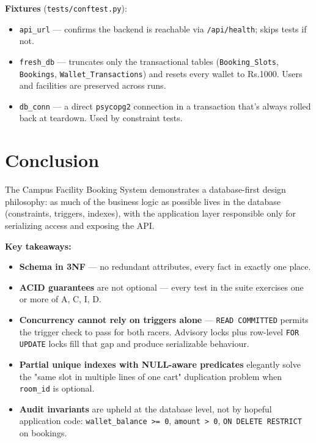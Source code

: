 \documentclass[11pt,a4paper]{article}
\begin{document}
\textbf{Fixtures} (\texttt{tests/conftest.py}):
\begin{itemize}[leftmargin=*]
    \item \texttt{api\_url} --- confirms the backend is reachable via \texttt{/api/health}; skips tests if not.
    \item \texttt{fresh\_db} --- truncates only the transactional tables (\texttt{Booking\_Slots}, \texttt{Bookings}, \texttt{Wallet\_Transactions}) and resets every wallet to Rs.1000. Users and facilities are preserved across runs.
    \item \texttt{db\_conn} --- a direct \texttt{psycopg2} connection in a transaction that's always rolled back at teardown. Used by constraint tests.
\end{itemize}

\newpage
\section{Conclusion}

The Campus Facility Booking System demonstrates a database-first design philosophy: as much of the business logic as possible lives in the database (constraints, triggers, indexes), with the application layer responsible only for serializing access and exposing the API.

\textbf{Key takeaways:}
\begin{itemize}[leftmargin=*]
    \item \textbf{Schema in 3NF} --- no redundant attributes, every fact in exactly one place.
    \item \textbf{ACID guarantees} are not optional --- every test in the suite exercises one or more of A, C, I, D.
    \item \textbf{Concurrency cannot rely on triggers alone} --- \texttt{READ COMMITTED} permits the trigger check to pass for both racers. Advisory locks plus row-level \texttt{FOR UPDATE} locks fill that gap and produce serializable behaviour.
    \item \textbf{Partial unique indexes with NULL-aware predicates} elegantly solve the "same slot in multiple lines of one cart" duplication problem when \texttt{room\_id} is optional.
    \item \textbf{Audit invariants} are upheld at the database level, not by hopeful application code: \texttt{wallet\_balance >= 0}, \texttt{amount > 0}, \texttt{ON DELETE RESTRICT} on bookings.
\end{itemize}
\end{document}
